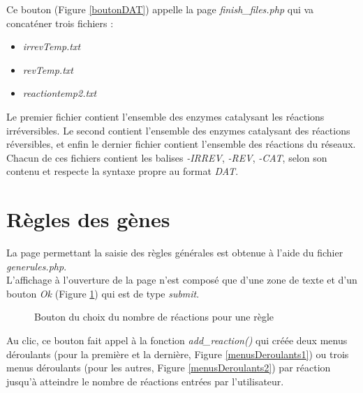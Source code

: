 Ce bouton (Figure \ref{boutonDAT}) appelle la page \emph{finish\_files.php} qui va concaténer trois fichiers :
\begin{itemize}
\item \emph{irrevTemp.txt}
\item \emph{revTemp.txt}
\item \emph{reactiontemp2.txt}
\end{itemize}
Le premier fichier contient l'ensemble des enzymes catalysant les réactions irréversibles. Le second contient l'ensemble des enzymes catalysant des réactions réversibles, et enfin le dernier fichier contient l'ensemble des réactions du réseaux. \\
Chacun de ces fichiers contient les balises \emph{-IRREV}, \emph{-REV}, \emph{-CAT}, selon son contenu et respecte la syntaxe propre au format \emph{DAT}.

\section{Règles des gènes}

La page permettant la saisie des règles générales est obtenue à l'aide du fichier \emph{generules.php}.\\
L'affichage à l'ouverture de la page n'est composé que d'une zone de texte et d'un bouton \emph{Ok} (Figure \ref{boutonOK}) qui est de type \textit{submit}. 

\begin{figure}[!ht]
	\begin{center}
		\caption{Bouton du choix du nombre de réactions pour une règle}
  		\label{boutonOK}
  	\end{center}	
\end{figure}

Au clic, ce bouton fait appel à la fonction \emph{add\_reaction()} qui créée  deux menus déroulants (pour la première et la dernière, Figure \ref{menusDeroulants1}) ou trois menus déroulants (pour les autres, Figure \ref{menusDeroulants2}) par réaction jusqu'à atteindre le nombre de réactions entrées par l'utilisateur. 

